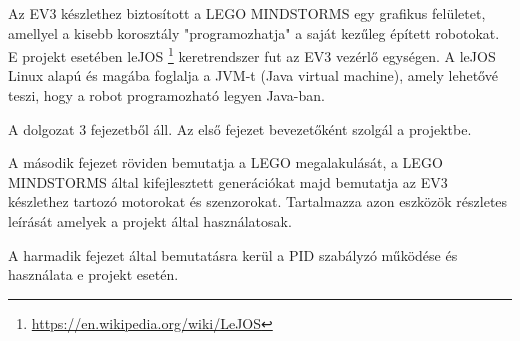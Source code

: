 Az EV3 készlethez biztosított a LEGO MINDSTORMS egy grafikus felületet, amellyel a kisebb korosztály "programozhatja" a saját kezűleg épített robotokat. E projekt esetében leJOS \footnote{\href {https://en.wikipedia.org/wiki/LeJOS}{https://en.wikipedia.org/wiki/LeJOS}} keretrendszer fut az EV3 vezérlő egységen. A leJOS Linux alapú és magába foglalja a JVM-t (Java virtual machine), amely lehetővé teszi, hogy a robot programozható legyen Java-ban. 

A dolgozat 3 fejezetből áll. Az első fejezet bevezetőként szolgál a projektbe.

A második fejezet röviden bemutatja a LEGO megalakulását, a LEGO MINDSTORMS által kifejlesztett generációkat majd bemutatja az EV3 készlethez tartozó motorokat és szenzorokat. Tartalmazza azon eszközök részletes leírását amelyek a projekt által használatosak.

A harmadik fejezet által bemutatásra kerül a PID szabályzó működése és használata e projekt esetén.